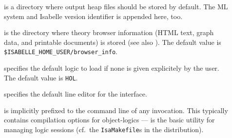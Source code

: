 \begin{isabellebody}
\begin{isamarkuptext}
\begin{description}
  \item[\hypertarget{setting.ISABELLE-OUTPUT}{\hyperlink{setting.ISABELLE-OUTPUT}{\mbox{}}}] is a
  directory where output heap files should be stored by default. The
  ML system and Isabelle version identifier is appended here, too.
  
  \item[\hypertarget{setting.ISABELLE-BROWSER-INFO}{\hyperlink{setting.ISABELLE-BROWSER-INFO}{\mbox{}}}] is the directory where
  theory browser information (HTML text, graph data, and printable
  documents) is stored (see also ).  The default
  value is \verb|$ISABELLE_HOME_USER/browser_info|.
  
  \item[\hypertarget{setting.ISABELLE-LOGIC}{\hyperlink{setting.ISABELLE-LOGIC}{\mbox{}}}] specifies the default logic to
  load if none is given explicitely by the user.  The default value is
  \verb|HOL|.
  
  \item[\hypertarget{setting.ISABELLE-LINE-EDITOR}{\hyperlink{setting.ISABELLE-LINE-EDITOR}{\mbox{}}}] specifies the default
  line editor for the \hyperlink{tool.tty}{\mbox{}} interface.

  \item[\hypertarget{setting.ISABELLE-USEDIR-OPTIONS}{\hyperlink{setting.ISABELLE-USEDIR-OPTIONS}{\mbox{}}}] is implicitly prefixed
  to the command line of any \hyperlink{tool.usedir}{\mbox{}} invocation. This
  typically contains compilation options for object-logics --- \hyperlink{tool.usedir}{\mbox{}} is the basic utility for managing logic sessions (cf.\ the
  \verb|IsaMakefile|s in the distribution).


\end{description}
\end{isamarkuptext}
\end{isabellebody}

